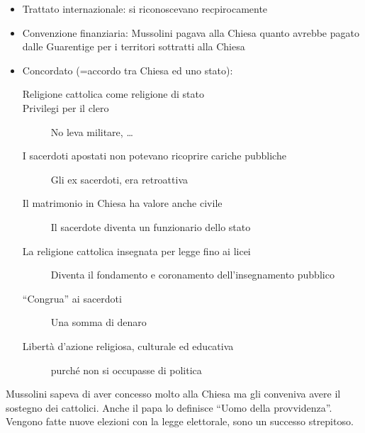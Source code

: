 \begin{itemize}
  \item Trattato internazionale: si riconoscevano recpirocamente
  \item Convenzione finanziaria: Mussolini pagava alla Chiesa quanto avrebbe pagato dalle Guarentige
    per i territori sottratti alla Chiesa
  \item Concordato (=accordo tra Chiesa ed uno stato):
    \begin{description}
      \item[Religione cattolica come religione di stato] 
      \item[Privilegi per il clero] No leva militare, \ldots
      \item[I sacerdoti apostati non potevano ricoprire cariche pubbliche] Gli ex sacerdoti, era
        retroattiva
      \item[Il matrimonio in Chiesa ha valore anche civile] Il sacerdote diventa un funzionario dello
        stato
      \item[La religione cattolica insegnata per legge fino ai licei] Diventa il fondamento e 
        coronamento dell'insegnamento pubblico
      \item[``Congrua'' ai sacerdoti] Una somma di denaro
      \item[Libertà d'azione religiosa, culturale ed educativa] purché non si occupasse di politica
    \end{description}
\end{itemize}
Mussolini sapeva di aver concesso molto alla Chiesa ma gli conveniva avere il sostegno dei cattolici.
Anche il papa lo definisce ``Uomo della provvidenza''.\\
Vengono fatte nuove elezioni con la legge elettorale, sono un successo strepitoso.
